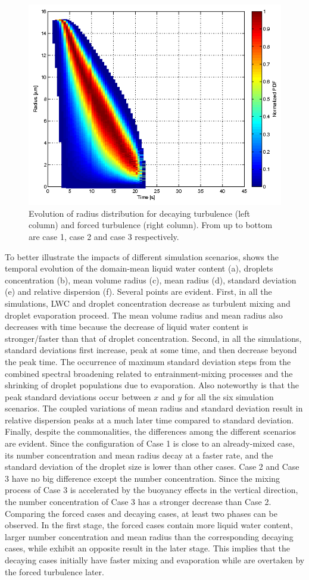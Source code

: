 \begin{figure}[!htbp]
\includegraphics[width=0.48\linewidth]{Figures/pdf_radius_f3}
\caption{Evolution of radius distribution for decaying turbulence (left column) 
and forced turbulence (right column). From up to bottom are case 1, case 2 and case 3 respectively.}\label{fig:rad_distri}
\end{figure}

To better illustrate the impacts of different simulation scenarios,  shows the temporal evolution of the domain-mean liquid water content (a), droplets concentration (b), 
mean volume radius (c), mean radius (d), standard deviation (e) and relative dispersion (f). Several points are evident. First, in all the simulations, LWC and droplet concentration decrease as turbulent mixing and droplet evaporation proceed. The mean volume radius and mean radius also decreases with time because the decrease of liquid water content is stronger/faster than that of droplet concentration. Second, in all the simulations, standard deviations first increase, peak at some time, and then decrease beyond the peak time. The occurrence of maximum standard deviation steps from the combined spectral broadening related to entrainment-mixing processes and the shrinking of droplet populations due to evaporation. Also noteworthy is that the peak standard deviations occur between $x$ and $y$ for all the six simulation scenarios. The coupled variations of mean radius and standard deviation result in relative dispersion peaks at a much later time compared to standard deviation. Finally, despite the commonalities, the differences among the different scenarios are evident. Since the configuration of Case 1 is close to an already-mixed case, its number concentration and mean radius decay at a faster rate, and the standard deviation of the droplet size is lower than other cases. Case 2 and Case 3 have no big difference except the number concentration. Since the mixing process of Case 3 is accelerated by the buoyancy effects in the vertical direction, the number concentration of Case 3 has a stronger decrease than Case 2. Comparing the forced cases and decaying cases, at least two phases can be observed. In the first stage, the forced cases contain more liquid water content, larger number concentration and mean radius than the corresponding decaying cases, while exhibit an opposite result in the later stage. This implies that the decaying cases initially have faster mixing and evaporation while are overtaken by the forced turbulence later. 
  
